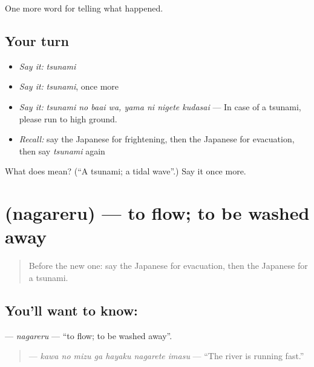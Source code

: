 \begin{grammarlens}[title={What you've built}]
One more word for telling what happened.
\end{grammarlens}

\subsection*{Your turn}
\begin{itemize}
\raggedright
  \item \emph{Say it:} \emph{tsunami}
  \item \emph{Say it:} \emph{tsunami}, once more
  \item \emph{Say it:} \emph{tsunami no baai wa, yama ni nigete kudasai} — In case of a tsunami, please run to high ground.
  \item \emph{Recall:} say the Japanese for frightening, then the Japanese for evacuation, then say \emph{tsunami} again
\end{itemize}

\begin{tcolorbox}[breakable,colback=teal!4,colframe=teal!35!black,title={Before you move on}]
What does  mean? (\textquotedblleft{}A tsunami; a tidal wave\textquotedblright{}.) Say it once more.
\end{tcolorbox}
\section[\texorpdfstring{\ja{ながれる} (nagareru)}{ながれる (nagareru)}]{ (nagareru) — to flow; to be washed away}

\label{lesson:JA-C275-nagareru}



\begin{quote}
Before the new one: say the Japanese for evacuation, then the Japanese for a tsunami.
\end{quote}

\subsection*{You'll want to know: }
\textbf{} — \emph{nagareru} — \textquotedblleft{}to flow; to be washed away\textquotedblright{}.

\begin{quote}
\textbf{   } — \emph{kawa no mizu ga hayaku nagarete imasu} — \textquotedblleft{}The river is running fast.\textquotedblright{}
\end{quote}

